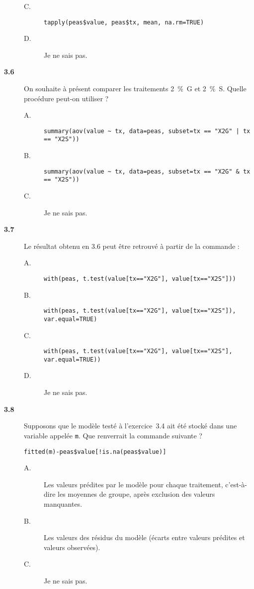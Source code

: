 \documentclass[11pt]{report}
\theoremstyle{definition}
\begin{document}
\begin{description}
\begin{description}
  \item[C.] \verb|tapply(peas$value, peas$tx, mean, na.rm=TRUE)|
  \item[D.] Je ne sais pas.
  \end{description}  
\item[\bf 3.6]  On souhaite à présent comparer les
  traitements 2~\%~G et 2~\%~S. Quelle procédure peut-on utiliser ?
  \begin{description}
  \item[A.] \verb+summary(aov(value ~ tx, data=peas, subset=tx == "X2G" | tx == "X2S"))+
  \item[B.] \verb|summary(aov(value ~ tx, data=peas, subset=tx == "X2G" & tx == "X2S"))|
  \item[C.] Je ne sais pas.
  \end{description}
\item[\bf 3.7]  Le résultat obtenu en 3.6 peut être
  retrouvé à partir de la commande :
  \begin{description}
  \item[A.] \verb|with(peas, t.test(value[tx=="X2G"], value[tx=="X2S"]))|
  \item[B.] \verb|with(peas, t.test(value[tx=="X2G"], value[tx=="X2S"]), var.equal=TRUE)|
  \item[C.] \verb|with(peas, t.test(value[tx=="X2G"], value[tx=="X2S"], var.equal=TRUE))|
  \item[D.] Je ne sais pas.
  \end{description}
\item[\bf 3.8]  Supposons que le
  modèle testé à l'exercice~3.4 ait été stocké dans une variable appelée
  \texttt{m}. Que renverrait la commande suivante ?
\begin{verbatim}
fitted(m)-peas$value[!is.na(peas$value)]
\end{verbatim}
  \begin{description}
  \item[A.] Les valeurs prédites par le modèle pour chaque traitement,
    c'est-à-dire les moyennes de groupe, après exclusion des valeurs
    manquantes. 
  \item[B.] Les valeurs des résidus du modèle (écarts entre valeurs prédites
    et valeurs observées).
  \item[C.] Je ne sais pas.
  \end{description}
\end{description}  
\end{document}
